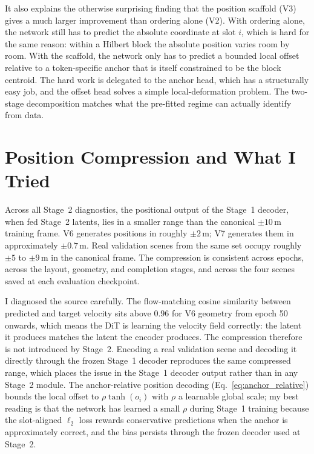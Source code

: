 It also explains the otherwise surprising finding that the position scaffold (V3) gives a much larger improvement than ordering alone (V2). With ordering alone, the network still has to predict the absolute coordinate at slot $i$, which is hard for the same reason: within a Hilbert block the absolute position varies room by room. With the scaffold, the network only has to predict a bounded local offset relative to a token-specific anchor that is itself constrained to be the block centroid. The hard work is delegated to the anchor head, which has a structurally easy job, and the offset head solves a simple local-deformation problem. The two-stage decomposition matches what the pre-fitted regime can actually identify from data.

\section{Position Compression and What I Tried}
\label{sec:disc_compression}

Across all Stage~2 diagnostics, the positional output of the Stage~1 decoder, when fed Stage~2 latents, lies in a smaller range than the canonical $\pm 10$\,m training frame. V6 generates positions in roughly $\pm 2$\,m; V7 generates them in approximately $\pm 0.7$\,m. Real validation scenes from the same set occupy roughly $\pm 5$ to $\pm 9$\,m in the canonical frame. The compression is consistent across epochs, across the layout, geometry, and completion stages, and across the four scenes saved at each evaluation checkpoint.

I diagnosed the source carefully. The flow-matching cosine similarity between predicted and target velocity sits above $0.96$ for V6 geometry from epoch 50 onwards, which means the DiT is learning the velocity field correctly: the latent it produces matches the latent the encoder produces. The compression therefore is not introduced by Stage~2. Encoding a real validation scene and decoding it directly through the frozen Stage~1 decoder reproduces the same compressed range, which places the issue in the Stage~1 decoder output rather than in any Stage~2 module. The anchor-relative position decoding (Eq.~\eqref{eq:anchor_relative}) bounds the local offset to $\rho \tanh(o_i)$ with $\rho$ a learnable global scale; my best reading is that the network has learned a small $\rho$ during Stage~1 training because the slot-aligned $\ell_2$ loss rewards conservative predictions when the anchor is approximately correct, and the bias persists through the frozen decoder used at Stage~2.

